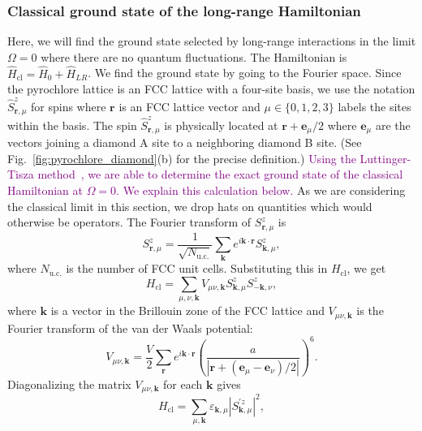 \documentclass[twocolumn,superscriptaddress,amsmath,amssymb,aps,prx,nofootinbib]{revtex4-2}
\newcommand{\newtext}[1]{\textcolor{purple}{#1}}
\begin{document}
\subsubsection{Classical ground state of the long-range Hamiltonian}\label{sec:classical}

Here, we will find the ground state selected by long-range interactions in the limit $\Omega = 0$ where there are no quantum fluctuations. The Hamiltonian is $\hat{H}_{\text{cl}} = \hat{H}_0 +  \hat{H}_{LR}$. We find the ground state by going to the Fourier space. Since the pyrochlore lattice is an FCC lattice with a four-site basis, we use the notation $\hat{S}^z_{\mathbf{r},\mu}$ for spins where $\mathbf{r}$ is an FCC lattice vector and $\mu \in \{ 0, 1,2,3 \}$ labels the sites within the basis. The spin $\hat{S}^z_{\mathbf{r},\mu}$ is physically located at $\mathbf{r} + \mathbf{e}_\mu/2$ where $\mathbf{e}_\mu$ are the vectors joining a diamond A site to a neighboring diamond B site. (See Fig.~\ref{fig:pyrochlore_diamond}(b) for the precise definition.)
\newtext{Using the Luttinger-Tisza method~\cite{luttinger1946theory, lyons1960method,litvin1974luttinger}, we are able to determine the exact ground state of the classical Hamiltonian at $\Omega=0$. We explain this calculation below.}
As we are considering the classical limit in this section, we drop hats on quantities which would otherwise be operators. The Fourier transform of $S_{\mathbf{r},\mu}^z$ is
\begin{equation}
  S^z_{\mathbf{r},\mu} = \frac{1}{\sqrt{N_{\text{u.c.}}}} \sum_{\mathbf{k}} e^{i \mathbf{k} \cdot \mathbf{r}}S^z_{\mathbf{k},\mu},
\end{equation}
where $N_{\text{u.c.}}$ is the number of FCC unit cells. Substituting this in $H_{\text{cl}}$, we get 
\begin{equation}
  H_{\text{cl} } = \sum_{\mu,\nu,\mathbf{k}} V_{\mu\nu,\mathbf{k}} S^z_{\mathbf{k},\mu} S^z_{-\mathbf{k},\nu},
\end{equation}
where $\mathbf{k}$ is a vector in the Brillouin zone of the FCC lattice and $V_{\mu\nu,\mathbf{k}}$ is the Fourier transform of the van der Waals potential:
\begin{equation} \label{eq:vlr_ft}
V_{\mu\nu,\mathbf{k}} = \frac{V}{2 } \sum_{\mathbf{r}} e^{i \mathbf{k}\cdot \mathbf{r}} \left( \frac{a}{|\mathbf{r} + (\mathbf{e}_\mu - \mathbf{e}_\nu)/2 |} \right)^6.
\end{equation}
Diagonalizing the matrix $V_{\mu\nu,\mathbf{k}}$ for each $\mathbf{k}$ gives
\begin{equation} \label{eq:H_Omega_0_fourier}
  H_\text{cl} = \sum_{\mu, \mathbf{k}} \varepsilon_{\mathbf{k},\mu} |S^{'z}_{\mathbf{k},\mu}|^2,
\end{equation}
\end{document}
